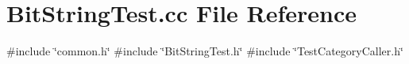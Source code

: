 \section{Bit\+String\+Test.\+cc File Reference}
\label{BitStringTest_8cc}
{\ttfamily \#include \char`\"{}common.\+h\char`\"{}}\newline
{\ttfamily \#include \char`\"{}Bit\+String\+Test.\+h\char`\"{}}\newline
{\ttfamily \#include \char`\"{}Test\+Category\+Caller.\+h\char`\"{}}\newline
